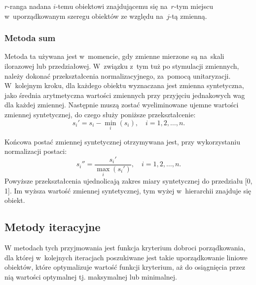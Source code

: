 \documentclass[12pt,a4paper]{report}
\begin{document}
$r$-ranga nadana $i$-temu obiektowi znajdującemu się na~$r$-tym miejscu w~uporządkowanym
szeregu obiektów ze względu na~$j$-tą zmienną.


\subsubsection{Metoda sum}


Metoda ta używana jest w~momencie, gdy zmienne mierzone są na~skali ilorazowej lub przedziałowej. W~związku z~tym tuż po stymulacji zmiennych, należy dokonać przekształcenia normalizacyjnego, za~pomocą unitaryzacji. W~kolejnym kroku, dla każdego obiektu wyznaczana jest zmienna syntetyczna, jako średnia arytmetyczna wartości zmiennych przy przyjęciu jednakowych wag dla każdej zmiennej.
Następnie muszą zostać wyeliminowane ujemne wartości zmiennej syntetycznej, do czego służy poniższe przekształcenie:
$$
s_{i}'=s_{i}-\min\limits_{i}(s_i), \quad i=1, 2, \ldots, n.
$$

Końcowa postać zmiennej syntetycznej otrzymywana jest, przy wykorzystaniu normalizacji postaci: %
$$
s_{i}''=\frac{s_{i}'}{\max\limits_{i}(s_{i}')},\quad i=1, 2, \ldots, n.
$$
Powyższe przekształcenia ujednolicają zakres miary syntetycznej do przedziału [0, 1]. Im wyższa wartość zmiennej syntetycznej, tym wyżej w~hierarchii znajduje się obiekt.%


\subsection{Metody iteracyjne}

W metodach tych przyjmowania jest funkcja kryterium dobroci porządkowania, dla której w~kolejnych iteracjach poszukiwane jest takie uporządkowanie liniowe obiektów, które optymalizuje wartość funkcji kryterium, aż do osiągnięcia przez nią wartości optymalnej tj. maksymalnej lub minimalnej. 
\end{document}
